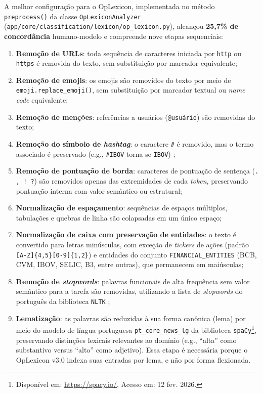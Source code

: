 A melhor configuração para o OpLexicon, implementada no método \texttt{preprocess()} da classe \texttt{OpLexiconAnalyzer} (\texttt{app/core/classification/lexicon/op\_lexicon.py}), alcançou \textbf{25,7\% de concordância} humano-modelo e compreende nove etapas sequenciais:

\begin{enumerate}
	\item \textbf{Remoção de URLs}: toda sequência de caracteres iniciada por \texttt{http} ou \texttt{https} é removida do texto, sem substituição por marcador equivalente;
	
	\item \textbf{Remoção de emojis}: os emojis são removidos do texto por meio de \texttt{emoji.replace\_emoji()}, sem substituição por marcador textual ou \textit{name code} equivalente;
	
	\item \textbf{Remoção de menções}: referências a usuários (\texttt{@usuário}) são removidas do texto;
	
	\item \textbf{Remoção do símbolo de \textit{hashtag}}: o caractere \texttt{\#} é removido, mas o termo associado é preservado (e.g., \texttt{\#IBOV} torna-se \texttt{IBOV}) \cite{ranco2015};
	
	\item \textbf{Remoção de pontuação de borda}: caracteres de pontuação de sentença (\texttt{. , ! ?}) são removidos apenas das extremidades de cada \textit{token}, preservando pontuação interna com valor semântico ou estrutural;
	
	\item \textbf{Normalização de espaçamento}: sequências de espaços múltiplos, tabulações e quebras de linha são colapsadas em um único espaço;
	
	\item \textbf{Normalização de caixa com preservação de entidades}: o texto é convertido para letras minúsculas, com exceção de \textit{tickers} de ações (padrão \texttt{[A-Z]\{4,5\}[0-9]\{1,2\}}) e entidades do conjunto \texttt{FINANCIAL\_ENTITIES} (BCB, CVM, IBOV, SELIC, B3, entre outras), que permanecem em maiúsculas;
	
	\item \textbf{Remoção de \textit{stopwords}}: palavras funcionais de alta frequência sem valor semântico para a tarefa são removidas, utilizando a lista de \textit{stopwords} do português da biblioteca \texttt{NLTK} \cite{jurafsky2026};
	
	\item \textbf{Lematização}: as palavras são reduzidas à sua forma canônica (lema) por meio do modelo de língua portuguesa \texttt{pt\_core\_news\_lg} da biblioteca \texttt{spaCy}\footnote{Disponível em: \url{https://spacy.io/}. Acesso em: 12 fev. 2026.}, preservando distinções lexicais relevantes ao domínio (e.g., ``alta'' como substantivo versus ``alto'' como adjetivo). Essa etapa é necessária porque o OpLexicon v3.0 indexa suas entradas por lema, e não por forma flexionada.
\end{enumerate}

